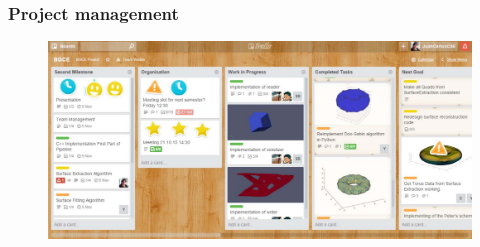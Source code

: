 \begin{frame}

	\frametitle{Project management}

	\begin{figure}
	\includegraphics[scale=0.3]{Pictures/DC/Trello.pdf}
	\end{figure}
	
\end{frame}
